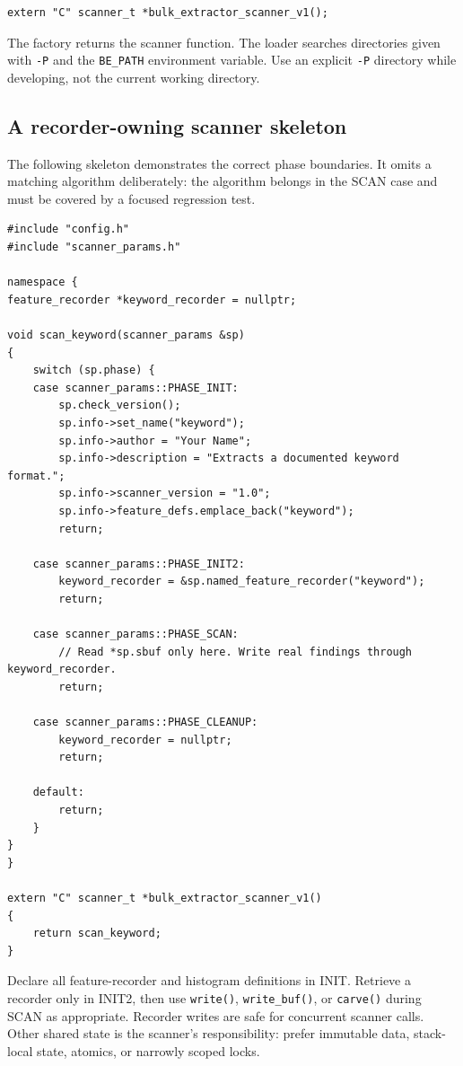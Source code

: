 \documentclass[11pt]{article}
\newcommand{\code}[1]{\texttt{#1}}
\begin{document}
\begin{Verbatim}
extern "C" scanner_t *bulk_extractor_scanner_v1();
\end{Verbatim}

The factory returns the scanner function. The loader searches directories
given with \code{-P} and the \code{BE\_PATH} environment variable. Use an
explicit \code{-P} directory while developing, not the current working
directory.

\subsection{A recorder-owning scanner skeleton}

The following skeleton demonstrates the correct phase boundaries. It omits a
matching algorithm deliberately: the algorithm belongs in the SCAN case and
must be covered by a focused regression test.

\begin{Verbatim}
#include "config.h"
#include "scanner_params.h"

namespace {
feature_recorder *keyword_recorder = nullptr;

void scan_keyword(scanner_params &sp)
{
    switch (sp.phase) {
    case scanner_params::PHASE_INIT:
        sp.check_version();
        sp.info->set_name("keyword");
        sp.info->author = "Your Name";
        sp.info->description = "Extracts a documented keyword format.";
        sp.info->scanner_version = "1.0";
        sp.info->feature_defs.emplace_back("keyword");
        return;

    case scanner_params::PHASE_INIT2:
        keyword_recorder = &sp.named_feature_recorder("keyword");
        return;

    case scanner_params::PHASE_SCAN:
        // Read *sp.sbuf only here. Write real findings through keyword_recorder.
        return;

    case scanner_params::PHASE_CLEANUP:
        keyword_recorder = nullptr;
        return;

    default:
        return;
    }
}
}

extern "C" scanner_t *bulk_extractor_scanner_v1()
{
    return scan_keyword;
}
\end{Verbatim}

Declare all feature-recorder and histogram definitions in INIT. Retrieve a
recorder only in INIT2, then use \code{write()}, \code{write\_buf()}, or
\code{carve()} during SCAN as appropriate. Recorder writes are safe for
concurrent scanner calls. Other shared state is the scanner's responsibility:
prefer immutable data, stack-local state, atomics, or narrowly scoped locks.
\end{document}
